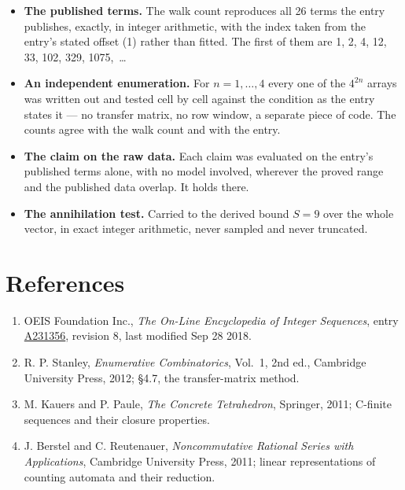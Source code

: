 \documentclass[11pt]{article}
\theoremstyle{definition}
\begin{document}
\begin{itemize}

\item {\bfseries The published terms.} The walk count reproduces all 26 terms the entry publishes, exactly, in integer arithmetic, with the index taken from the entry's stated offset (1) rather than fitted. The first of them are 1, 2, 4, 12, 33, 102, 329, 1075,~\dots

\item {\bfseries An independent enumeration.} For $n = 1,\dots,4$ every one of the $4^{2n}$ arrays was written out and tested cell by cell against the condition as the entry states it --- no transfer matrix, no row window, a separate piece of code. The counts agree with the walk count and with the entry.

\item {\bfseries The claim on the raw data.} Each claim was evaluated on the entry's published terms alone, with no model involved, wherever the proved range and the published data overlap. It holds there.

\item {\bfseries The annihilation test.} Carried to the derived bound $S = 9$ over the whole vector, in exact integer arithmetic, never sampled and never truncated.

\end{itemize}

\section{References}

\begin{enumerate}

\item OEIS Foundation Inc., \emph{The On-Line Encyclopedia of Integer Sequences}, entry \href{https://oeis.org/A231356}{A231356}, revision 8, last modified Sep 28 2018.

\item R. P. Stanley, \emph{Enumerative Combinatorics}, Vol.~1, 2nd ed., Cambridge University Press, 2012; \S4.7, the transfer-matrix method.

\item M. Kauers and P. Paule, \emph{The Concrete Tetrahedron}, Springer, 2011; C-finite sequences and their closure properties.

\item J. Berstel and C. Reutenauer, \emph{Noncommutative Rational Series with Applications}, Cambridge University Press, 2011; linear representations of counting automata and their reduction.

\end{enumerate}
\end{document}
